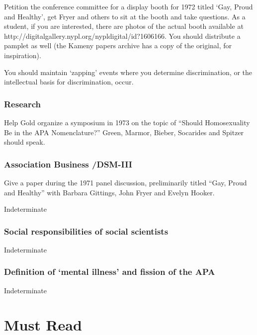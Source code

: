 \begin{refsection}
Petition the conference committee for a display booth for 1972 titled `Gay, Proud and Healthy', get Fryer and others to sit at the booth and take questions. As a student, if you are interested, there are photos of the actual booth available at http:\slash \slash digitalgallery.nypl.org\slash nypldigital\slash id?1606166. You should distribute a pamplet as well (the Kameny papers archive has a copy of the original, for inspiration).

You should maintain `zapping' events where you determine discrimination, or the intellectual basis for discrimination, occur.

\subsubsection{Research}
\label{research}

Help Gold organize a symposium in 1973 on the topic of “Should Homosexuality Be in the APA Nomenclature?” Green, Marmor, Bieber, Socarides and Spitzer should speak.

\subsubsection{Association Business \slash  DSM-III}
\label{associationbusinessdsm-iii}

\begin{writingtask}[Kameny]\label{writingtask:kameny}
Give a paper during the 1971 panel discussion, preliminarily titled “Gay, Proud and Healthy” with Barbara Gittings, John Fryer and Evelyn Hooker. 
\end{writingtask}

Indeterminate

\subsubsection{Social responsibilities of social scientists}
\label{socialresponsibilitiesofsocialscientists}

Indeterminate

\subsubsection{Definition of ‘mental illness’ and fission of the APA}
\label{definitionof‘mentalillness’andfissionoftheapa}

Indeterminate

\section{Must Read}
\label{mustread}


\end{refsection}
